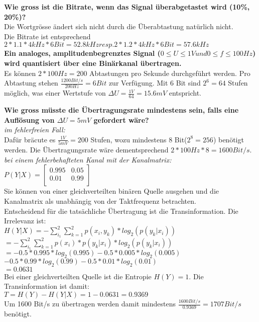 \textbf{Wie gross ist die Bitrate, wenn das Signal überabgetastet wird (10\%, 20\%)?}\\
Die Wortgrösse ändert sich nicht durch die Überabtastung natürlich nicht.\\
Die Bitrate ist entsprechend $2*1.1*4kHz*6Bit=52.8kHz resp. 2*1.2*4kHz*6Bit=57.6kHz$\\

\textbf{Ein analoges, amplitudenbegrenztes Signal ($0 \leq  U \leq  1V und 0 \leq  f \leq  100Hz$) wird quantisiert über eine Binärkanal übertragen.}\\
Es können $2*100Hz=200$ Abtastungen pro Sekunde durchgeführt werden. Pro Abtastung stehen $\frac{1200Bit/s}{200Hz}=6Bit$ zur Verfügung. Mit 6 Bit sind $2^6=64$ Stufen möglich, was einer Wertstufe von $\Delta U=\frac{1V}{64}=15.6mV$ entspricht.\\

\columnbreak

\textbf{Wie gross müsste die Übertragungsrate mindestens sein, falls eine Auflösung von $\Delta U = 5mV$ gefordert wäre?}\\
\textit{im fehlerfreien Fall:}\\
Dafür bräcute es $\frac{1V}{5mV}=200$ Stufen, wozu mindestens 8 Bit($2^8=256$) benötigt werden. Die Übertragungsrate wäre dementsprechend $2*100Hz*8=1600Bit/s$.\\

\textit{bei einem fehlerbehafteten Kanal mit der Kanalmatrix:}\\
$P(Y|X)=\begin{bmatrix}
    0.995 & 0.05\\
    0.01 & 0.99\\
\end{bmatrix}$\\

Sie können von einer gleichverteilten binären Quelle ausgehen und die Kanalmatrix als unabhängig von der Taktfrequenz betrachten.\\
Entscheidend für die tatsächliche Übertragung ist die Transinformation. Die Irrelevanz ist:\\

$H(Y|X)=-\sum_{i_1}^2\sum_{k=1}^2p(x_i,y_k)*log_2(p(y_k|x_i))$\\
$=-\sum_{i_1}^2\sum_{k=1}^2p(x_i)*p(y_k|x_i)*log_2(p(y_k|x_i))$\\
$=-0.5*0.995*log_2(0.995)-0.5*0.005*log_2(0.005)$\\
$-0.5*0.99*log_2(0.99)-0.5*0.01*log_2(0.01)$\\
$=0.0631$\\

Bei einer gleichverteilten Quelle ist die Entropie $H(Y) = 1$. Die Transinformation ist damit:\\
$T=H(Y)-H(Y|X)=1-0.0631=0.9369$\\

Um 1600 Bit/s zu übertragen werden damit mindestens $\frac{1600 Bit/s}{0.9369}=1707 Bit/s$ benötigt.
